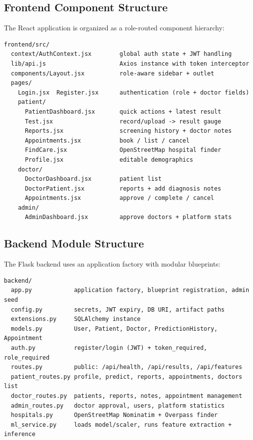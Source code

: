 \documentclass[oneside,a4paper,12pt]{report}
\begin{document}
\subsection{Frontend Component Structure}
The React application is organized as a role-routed component hierarchy:

\begin{verbatim}
frontend/src/
  context/AuthContext.jsx        global auth state + JWT handling
  lib/api.js                     Axios instance with token interceptor
  components/Layout.jsx          role-aware sidebar + outlet
  pages/
    Login.jsx  Register.jsx      authentication (role + doctor fields)
    patient/
      PatientDashboard.jsx       quick actions + latest result
      Test.jsx                   record/upload -> result gauge
      Reports.jsx                screening history + doctor notes
      Appointments.jsx           book / list / cancel
      FindCare.jsx               OpenStreetMap hospital finder
      Profile.jsx                editable demographics
    doctor/
      DoctorDashboard.jsx        patient list
      DoctorPatient.jsx          reports + add diagnosis notes
      Appointments.jsx           approve / complete / cancel
    admin/
      AdminDashboard.jsx         approve doctors + platform stats
\end{verbatim}

\subsection{Backend Module Structure}
The Flask backend uses an application factory with modular blueprints:

\begin{verbatim}
backend/
  app.py            application factory, blueprint registration, admin seed
  config.py         secrets, JWT expiry, DB URI, artifact paths
  extensions.py     SQLAlchemy instance
  models.py         User, Patient, Doctor, PredictionHistory, Appointment
  auth.py           register/login (JWT) + token_required, role_required
  routes.py         public: /api/health, /api/results, /api/features
  patient_routes.py profile, predict, reports, appointments, doctors list
  doctor_routes.py  patients, reports, notes, appointment management
  admin_routes.py   doctor approval, users, platform statistics
  hospitals.py      OpenStreetMap Nominatim + Overpass finder
  ml_service.py     loads model/scaler, runs feature extraction + inference
\end{verbatim}
\end{document}

